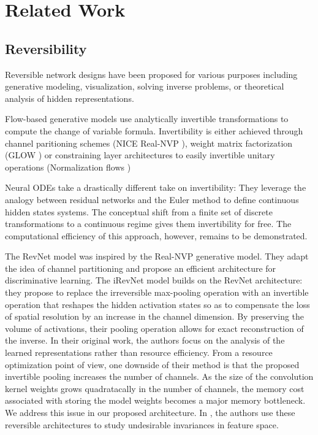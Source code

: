 \documentclass[twocolumn]{bmcart}
\begin{document}
\section{Related Work}
\subsection{Reversibility}

Reversible network designs have been proposed for various purposes including generative modeling, visualization, solving inverse problems, or theoretical analysis of hidden representations.

Flow-based generative models use analytically invertible transformations to compute the change of variable formula. Invertibility is either achieved through channel paritioning schemes (NICE \cite{dinh2014nice} Real-NVP \cite{dinh2016density}), weight matrix factorization (GLOW \cite{kingma2018glow}) or constraining layer architectures to easily invertible unitary operations (Normalization flows \cite{rezende2015variational})

Neural ODEs \cite{chen2018neural} take a drastically different take on invertibility: They leverage the analogy between residual networks and the Euler method to define continuous hidden states systems.
The conceptual shift from a finite set of discrete transformations to a continuous regime gives them invertibility for free. 
The computational efficiency of this approach, however, remains to be demonstrated.

The RevNet model \cite{gomez2017reversible} was inspired by the Real-NVP generative model. They adapt the idea of channel partitioning and propose an efficient architecture for discriminative learning.
The iRevNet \cite{jacobsen2018revnet} model builds on the RevNet architecture: they propose to replace the irreversible max-pooling operation with an invertible operation that reshapes the hidden activation states
so as to compensate the loss of spatial resolution by an increase in the channel dimension. 
By preserving the volume of activations, their pooling operation allows for exact reconstruction of the inverse.
In their original work, the authors focus on the analysis of the learned representations rather than resource efficiency.
From a resource optimization point of view, one downside of their method is that the proposed invertible pooling increases the number of channels.
As the size of the convolution kernel weights grows quadratacally in the number of channels, the memory cost associated with storing the model weights becomes a major memory bottleneck.
We address this issue in our proposed architecture.
In \cite{jacobsen2018excessive}, the authors use these reversible architectures to study undesirable invariances in feature space.
\end{document}
